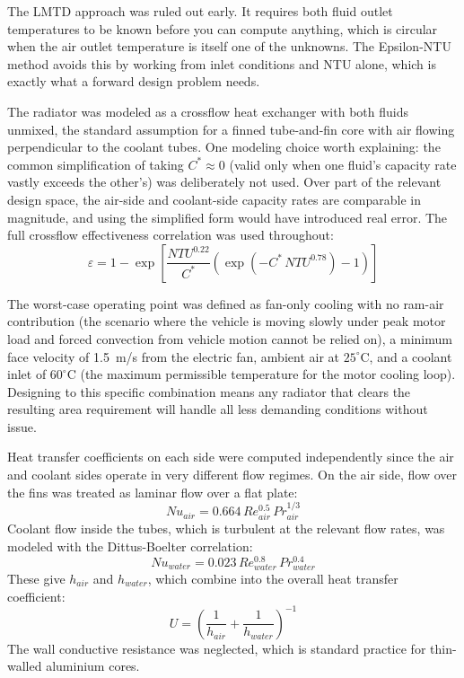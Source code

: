 \documentclass[12pt, a4paper]{article}
\begin{document}
The LMTD approach was ruled out early. It requires both fluid outlet temperatures to be known before you can compute anything, which is circular when the air outlet temperature is itself one of the unknowns. The Epsilon-NTU method avoids this by working from inlet conditions and NTU alone, which is exactly what a forward design problem needs.

The radiator was modeled as a crossflow heat exchanger with both fluids unmixed, the standard assumption for a finned tube-and-fin core with air flowing perpendicular to the coolant tubes. One modeling choice worth explaining: the common simplification of taking $C^* \approx 0$ (valid only when one fluid's capacity rate vastly exceeds the other's) was deliberately not used. Over part of the relevant design space, the air-side and coolant-side capacity rates are comparable in magnitude, and using the simplified form would have introduced real error. The full crossflow effectiveness correlation was used throughout:
\begin{equation}
    \varepsilon = 1 - \exp\left[\frac{NTU^{0.22}}{C^*}\left(\exp\left(-C^* \, NTU^{0.78}\right) - 1\right)\right]
\end{equation}

The worst-case operating point was defined as fan-only cooling with no ram-air contribution (the scenario where the vehicle is moving slowly under peak motor load and forced convection from vehicle motion cannot be relied on), a minimum face velocity of 1.5~m/s from the electric fan, ambient air at $25^\circ$C, and a coolant inlet of $60^\circ$C (the maximum permissible temperature for the motor cooling loop). Designing to this specific combination means any radiator that clears the resulting area requirement will handle all less demanding conditions without issue.

Heat transfer coefficients on each side were computed independently since the air and coolant sides operate in very different flow regimes. On the air side, flow over the fins was treated as laminar flow over a flat plate:
\begin{equation}
    Nu_{air} = 0.664\,Re_{air}^{0.5}\,Pr_{air}^{1/3}
\end{equation}
Coolant flow inside the tubes, which is turbulent at the relevant flow rates, was modeled with the Dittus-Boelter correlation:
\begin{equation}
    Nu_{water} = 0.023\,Re_{water}^{0.8}\,Pr_{water}^{0.4}
\end{equation}
These give $h_{air}$ and $h_{water}$, which combine into the overall heat transfer coefficient:
\begin{equation}
    U = \left(\frac{1}{h_{air}} + \frac{1}{h_{water}}\right)^{-1}
\end{equation}
The wall conductive resistance was neglected, which is standard practice for thin-walled aluminium cores.
\end{document}
